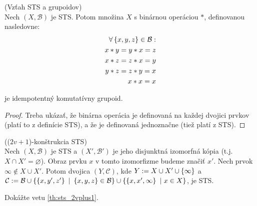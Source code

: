 \begin{theorem}{(Vzťah STS a grupoidov)}\\
Nech $(X, \mathcal{B})$ je STS. Potom množina $X$ s binárnou operáciou $\ast$, definovanou nasledovne:
\begin{align*}
    \forall \left\{x,y,z\right\} \in \mathcal{B}:\\
    x\ast y = y \ast x = z\\ 
    x \ast z = z \ast x = y\\ 
    y\ast z = z \ast y = x\\
    x \ast x = x
\end{align*}

je idempotentný komutatívny grupoid. 
\end{theorem}
\begin{proof}
Treba ukázať, že binárna operácia je definovaná na každej dvojici prvkov (platí to z definície STS), a že je definovaná jednoznačne (tiež platí z STS).
\end{proof}

\begin{theorem}{(($2v +1$)-konštrukcia STS)}\\
\label{th:sts_2vplus1}
Nech $(X, \mathcal{B})$ je STS a $(X', \mathcal{B}')$ je jeho disjunktná izomorfná kópia (t.j. $X \cap  X' = \varnothing$). Obraz prvku $x$ v tomto izomorfizme budeme značiť $x'$. 
Nech prvok $\infty \notin X \cup X'$.
Potom dvojica $(Y, \mathcal{C})$, kde $Y := X \cup X' \cup \left\{\infty\right\}$ a $\mathcal{C} := \mathcal{B} 
\cup \left\{\left\{x, y', z'\right\} ~|~ \left\{x,y,z\right\}\in \mathcal{B}\right\} 
\cup \left\{\left\{x, x', \infty\right\} ~|~ x \in X\right\}$, je STS.    
\end{theorem}
\begin{exercise}
Dokážte vetu \ref{th:sts_2vplus1}.
\end{exercise}

